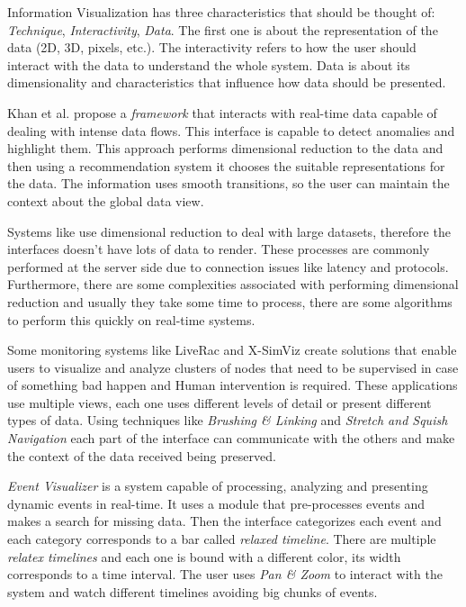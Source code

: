 \documentclass[letterpaper, 10 pt, conference]{ieeeconf}  %
\begin{document}
Information Visualization has three characteristics that should be thought of: \textit{Technique}, \textit{Interactivity}, \textit{Data}. The first one is about \cite{981847} the representation of the data (2D, 3D, pixels, etc.). The interactivity refers to how the user should interact with the data to understand the whole system. Data is about its dimensionality and characteristics that influence how data should be presented.

Khan et al. \cite{1878880183} propose a \textit{framework} that interacts with real-time data capable of dealing with intense data flows. This interface is capable to detect anomalies and highlight them. This approach performs dimensional reduction to the data and then using a recommendation system it chooses the suitable representations for the data. The information uses smooth transitions, so the user can maintain the context about the global data view.

Systems like \cite{traub2017i2, 7338157} use dimensional reduction to deal with large datasets, therefore the interfaces doesn't have lots of data to render. These processes are commonly performed at the server side due to connection issues like latency and protocols. Furthermore, there are some complexities associated with performing dimensional reduction and usually they take some time to process, there are some algorithms to perform this quickly on real-time systems.

Some monitoring systems like LiveRac \cite{McLachlan} and X-SimViz \cite{7338157} create solutions that enable users to visualize and analyze clusters of nodes that need to be supervised in case of something bad happen and Human intervention is required. These applications use multiple views, each one uses different levels of detail or present different types of data. Using techniques like \textit{Brushing \& Linking} and \textit{Stretch and Squish Navigation} each part of the interface can communicate with the others and make the context of the data received being preserved.

\textit{Event Visualizer} \cite{Fischer} is a system capable of processing, analyzing and presenting dynamic events in real-time. It uses a module that pre-processes events and makes a search for missing data. Then the interface categorizes each event and each category corresponds to a bar called \textit{relaxed timeline}. There are multiple \textit{relatex timelines} and each one is bound with a different color, its width corresponds to a time interval. The user uses \textit{Pan \& Zoom} to interact with the system and watch different timelines avoiding big chunks of events.
\end{document}
